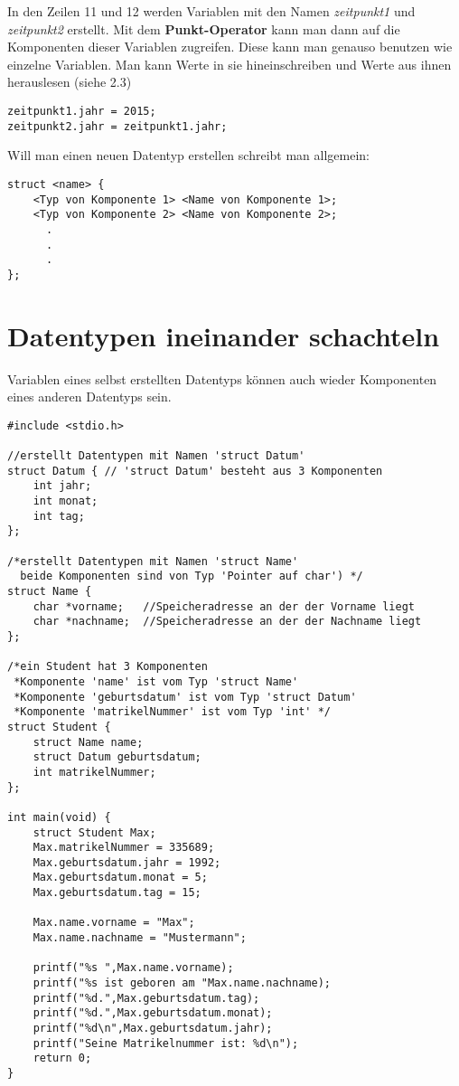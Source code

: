 \documentclass[c_worksheet.tex]{subfiles}
\begin{document}
In den Zeilen 11 und 12 werden Variablen mit den Namen \textit{zeitpunkt1} und \textit{zeitpunkt2} erstellt. Mit dem \textbf{Punkt-Operator} kann man dann auf die Komponenten dieser Variablen zugreifen. Diese kann man genauso benutzen wie einzelne Variablen. Man kann Werte in sie hineinschreiben und Werte aus ihnen herauslesen (siehe 2.3)

\begin{lstlisting}
zeitpunkt1.jahr = 2015;
zeitpunkt2.jahr = zeitpunkt1.jahr;
\end{lstlisting}

Will man einen neuen Datentyp erstellen schreibt man allgemein:
\begin{lstlisting}
struct <name> {
    <Typ von Komponente 1> <Name von Komponente 1>;
    <Typ von Komponente 2> <Name von Komponente 2>;
      .
      .
      .
};
\end{lstlisting}

\section{Datentypen ineinander schachteln}

Variablen eines selbst erstellten Datentyps können auch wieder Komponenten eines anderen Datentyps sein.

\begin{lstlisting}
#include <stdio.h>

//erstellt Datentypen mit Namen 'struct Datum'
struct Datum { // 'struct Datum' besteht aus 3 Komponenten
    int jahr;
    int monat;
    int tag;
};

/*erstellt Datentypen mit Namen 'struct Name'
  beide Komponenten sind von Typ 'Pointer auf char') */
struct Name { 
    char *vorname;   //Speicheradresse an der der Vorname liegt
    char *nachname;  //Speicheradresse an der der Nachname liegt
};

/*ein Student hat 3 Komponenten
 *Komponente 'name' ist vom Typ 'struct Name'
 *Komponente 'geburtsdatum' ist vom Typ 'struct Datum'
 *Komponente 'matrikelNummer' ist vom Typ 'int' */
struct Student {
    struct Name name;
    struct Datum geburtsdatum; 
    int matrikelNummer; 
};

int main(void) {
    struct Student Max;
    Max.matrikelNummer = 335689;
    Max.geburtsdatum.jahr = 1992;
    Max.geburtsdatum.monat = 5;
    Max.geburtsdatum.tag = 15;

    Max.name.vorname = "Max";
    Max.name.nachname = "Mustermann";

    printf("%s ",Max.name.vorname);
    printf("%s ist geboren am "Max.name.nachname);
    printf("%d.",Max.geburtsdatum.tag);
    printf("%d.",Max.geburtsdatum.monat);
    printf("%d\n",Max.geburtsdatum.jahr);
    printf("Seine Matrikelnummer ist: %d\n");
    return 0;
}
\end{lstlisting}
\end{document}
